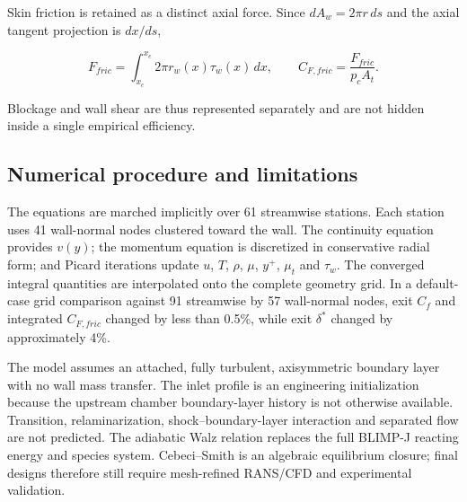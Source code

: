 Skin friction is retained as a distinct axial force. Since
\(dA_w=2\pi r\,ds\) and the axial tangent projection is \(dx/ds\),

\begin{equation}
\boxed{
F_{fric}=\int_{x_c}^{x_e}2\pi r_w(x)\tau_w(x)\,dx
},
\qquad
\boxed{
C_{F,fric}=\frac{F_{fric}}{p_cA_t}
}.
\label{eq:blimp_friction_force}
\end{equation}



Blockage and wall shear are thus represented separately and are not hidden inside a
single empirical efficiency.

\subsection{Numerical procedure and limitations}

The equations are marched implicitly over 61 streamwise stations. Each station uses
41 wall-normal nodes clustered toward the wall. The continuity equation provides
\(v(y)\); the momentum equation is discretized in conservative radial form; and
Picard iterations update \(u\), \(T\), \(\rho\), \(\mu\), \(y^+\), \(\mu_t\) and
\(\tau_w\). The converged integral quantities are interpolated onto the complete
geometry grid. In a default-case grid comparison against 91 streamwise by 57
wall-normal nodes, exit \(C_f\) and integrated \(C_{F,fric}\) changed by less than
0.5\%, while exit \(\delta^*\) changed by approximately 4\%.

The model assumes an attached, fully turbulent, axisymmetric boundary layer with no
wall mass transfer. The inlet profile is an engineering initialization because the
upstream chamber boundary-layer history is not otherwise available. Transition,
relaminarization, shock--boundary-layer interaction and separated flow are not
predicted. The adiabatic Walz relation \cite{Walz} replaces the full BLIMP-J reacting energy and
species system. Cebeci--Smith is an algebraic equilibrium closure; final designs
therefore still require mesh-refined RANS/CFD and experimental validation.
